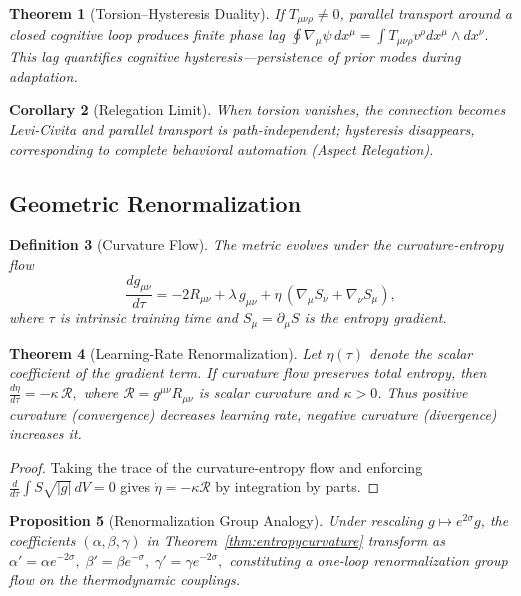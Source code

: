 \documentclass[12pt,a4paper,twoside,openright]{book}
\newtheorem{theorem}{Theorem}
\newtheorem{proposition}[theorem]{Proposition}
\newtheorem{definition}[theorem]{Definition}
\newtheorem{corollary}[theorem]{Corollary}
\begin{document}
\begin{theorem}[Torsion–Hysteresis Duality]
If $T_{\mu\nu\rho}\neq0$, parallel transport around a closed cognitive loop produces finite phase lag
\(
\oint\nabla_\mu\psi\,dx^\mu
 = \int T_{\mu\nu\rho}v^\rho dx^\mu\wedge dx^\nu.
\)
This lag quantifies cognitive hysteresis—persistence of prior modes during adaptation.
\end{theorem}

\begin{corollary}[Relegation Limit]
When torsion vanishes, the connection becomes Levi-Civita and parallel transport is path-independent;  
hysteresis disappears, corresponding to complete behavioral automation (Aspect Relegation).
\end{corollary}

\subsection*{Geometric Renormalization}

\begin{definition}[Curvature Flow]
The metric evolves under the curvature-entropy flow
\begin{equation}
\frac{d g_{\mu\nu}}{d\tau}
   = -2R_{\mu\nu} + \lambda\,g_{\mu\nu}
     + \eta\,(\nabla_\mu S_\nu+\nabla_\nu S_\mu),
\end{equation}
where $\tau$ is intrinsic training time and $S_\mu=\partial_\mu S$ is the entropy gradient.
\end{definition}

\begin{theorem}[Learning-Rate Renormalization]
Let $\eta(\tau)$ denote the scalar coefficient of the gradient term.  
If curvature flow preserves total entropy, then
\(
\frac{d\eta}{d\tau}=-\kappa\,\mathcal{R},
\)
where $\mathcal{R}=g^{\mu\nu}R_{\mu\nu}$ is scalar curvature and $\kappa>0$.  
Thus positive curvature (convergence) decreases learning rate, negative curvature (divergence) increases it.
\end{theorem}

\begin{proof}
Taking the trace of the curvature-entropy flow and enforcing $\tfrac{d}{d\tau}\int S\sqrt{|g|}\,dV=0$ gives $\dot\eta=-\kappa \mathcal{R}$ by integration by parts.
\end{proof}

\begin{proposition}[Renormalization Group Analogy]
Under rescaling $g\!\mapsto\!e^{2\sigma}g$, the coefficients $(\alpha,\beta,\gamma)$ in 
Theorem~\ref{thm:entropycurvature} transform as
\(
\alpha'=\alpha e^{-2\sigma},\;
\beta'=\beta e^{-\sigma},\;
\gamma'=\gamma e^{-2\sigma},
\)
constituting a one-loop renormalization group flow on the thermodynamic couplings.
\end{proposition}
\end{document}
